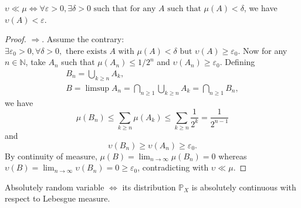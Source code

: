 \documentclass[11pt,singlecolumn, openany, citestyle=authoryear]{elegantbook}
\begin{document}
\begin{CJK}{UTF8}{gbsn}
\begin{proposition}
    $\upsilon\ll\mu\iff \forall \varepsilon > 0,\exists \delta > 0 \text{ such that for any }
    A \text{ such that } \mu(A)<\delta$, we have $\upsilon(A)<\varepsilon$.
\end{proposition}
\begin{proof}
    $\Longrightarrow$. Assume the contrary: $\exists \varepsilon_0>0,\forall \delta>0,
    \text{ there exists } A \text{ with } \mu(A)<\delta \text{ but } \upsilon(A)\geqslant \varepsilon_0$.
    Now for any $n\in\mathbb{N}$, take $A_n$ such that $\mu(A_n)\leqslant 1/2^n$
    and $\upsilon(A_n)\geqslant \varepsilon_0$. Defining
    \begin{gather*}
    B_n = \bigcup_{k\geqslant n}A_k,\\
    B=\limsup A_n = \bigcap_{n\geqslant1}\bigcup_{k\geqslant n}A_k = \bigcap_{n\geqslant1}B_n,
    \end{gather*}
    we have 
    $$
    \mu(B_n)\leqslant\sum_{k\geqslant n}\mu(A_k)\leqslant \sum_{k\geqslant n}\frac{1}{2^k}=\frac{1}{2^{n-1}}
    $$
    and
    $$
    \upsilon(B_n)\geqslant\upsilon(A_n)\geqslant \varepsilon_0.
    $$ 
    By continuity of measure, $\mu(B)=\displaystyle\lim_{n\to\infty}\mu(B_n)=0$ whereas 
    $\upsilon(B)=\displaystyle\lim_{n\to\infty}\upsilon(B_n)=0\geqslant\varepsilon_0$,
    contradicting with $\upsilon\ll\mu$.
\end{proof}
\begin{remark}
    Absolutely random variable $\iff$ its distribution $\mathbb{P}_X$ is absolutely 
    continuous with respect to Lebesgue measure.
\end{remark}


\end{CJK}
\end{document}
